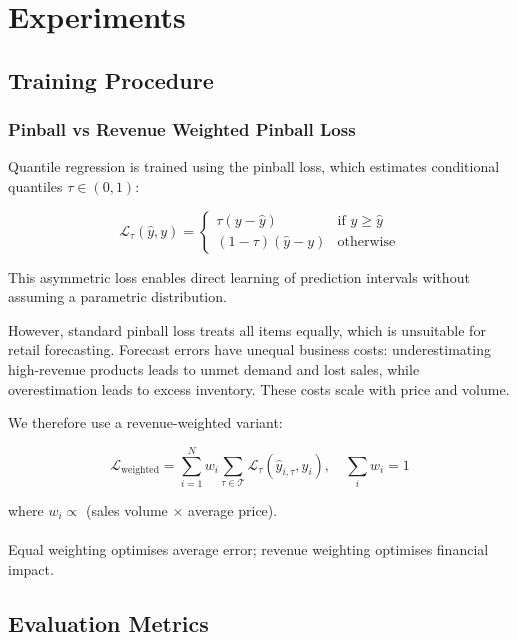 \section{Experiments}

\subsection{Training Procedure}

\subsubsection*{Pinball vs Revenue Weighted Pinball Loss}

Quantile regression is trained using the pinball loss, which estimates conditional quantiles \( \tau \in (0,1) \):

\begin{equation}
\mathcal{L}_{\tau}(\hat{y}, y) =
\begin{cases}
\tau (y - \hat{y}) & \text{if } y \geq \hat{y} \\
(1 - \tau)(\hat{y} - y) & \text{otherwise}
\end{cases}
\end{equation}

This asymmetric loss enables direct learning of prediction intervals without assuming a parametric distribution.

However, standard pinball loss treats all items equally, which is unsuitable for retail forecasting. Forecast errors have unequal business costs: underestimating high-revenue products leads to unmet demand and lost sales, while overestimation leads to excess inventory. These costs scale with price and volume.

We therefore use a revenue-weighted variant:

\begin{equation}
\mathcal{L}_{\text{weighted}} =
\sum_{i=1}^{N} w_i \sum_{\tau \in \mathcal{T}} \mathcal{L}_{\tau}(\hat{y}_{i,\tau}, y_i),
\quad \sum_i w_i = 1
\end{equation}

where \( w_i \propto \) (sales volume \( \times \) average price).

\paragraph{} Equal weighting optimises average error; revenue weighting optimises financial impact.

\subsection{Evaluation Metrics}
